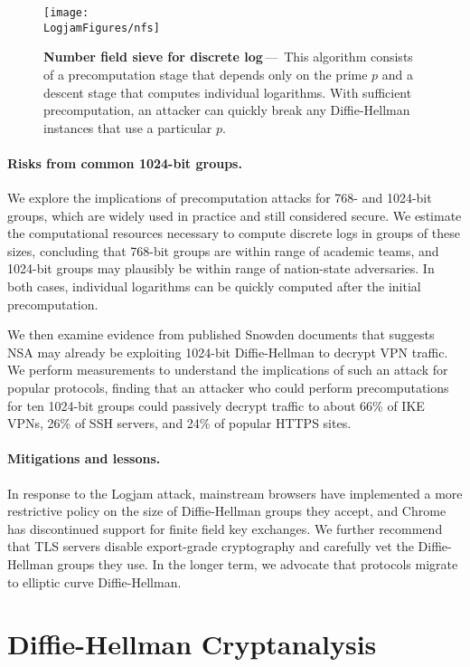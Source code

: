 \begin{figure*}[ht]
\centering\texttt{[image: \\LogjamFigures/nfs]}

\caption{\textbf{Number field sieve for discrete log}\,---\,%
This algorithm consists of a precomputation stage that depends only on the
prime $p$ and a descent stage that computes individual logarithms. With
sufficient precomputation, an attacker can quickly break any Diffie-Hellman
instances that use a particular $p$.
}
\label{fig:nfs}
\end{figure*}

\paragraph{Risks from common 1024-bit groups.}
We explore the implications of precomputation attacks for 768- and 1024-bit
groups, which are widely used in practice and still considered secure. We
estimate the computational resources necessary to compute discrete logs in
groups of these sizes, concluding that 768-bit groups are within range of
academic teams, and 1024-bit groups may plausibly be within range of
nation-state adversaries. In both cases, individual logarithms can be quickly
computed after the initial precomputation.

We then examine evidence from published Snowden documents that suggests NSA
may already be exploiting 1024-bit Diffie-Hellman to decrypt VPN traffic. We
perform measurements to understand the implications of such an attack for
popular protocols, finding that an attacker who could perform precomputations
for ten 1024-bit groups could passively decrypt traffic to about 66\% of IKE
VPNs, 26\% of SSH servers, and 24\% of popular HTTPS sites.

\paragraph{Mitigations and lessons.}
In response to the Logjam attack, mainstream browsers have implemented a more
restrictive policy on the size of Diffie-Hellman groups they accept, and
Chrome has discontinued support for finite field key exchanges. We further
recommend that TLS servers disable export-grade cryptography and carefully
vet the Diffie-Hellman groups they use. In the longer term, we advocate that
protocols migrate to elliptic curve Diffie-Hellman.

\section{Diffie-Hellman Cryptanalysis}
\label{sec:dl}

